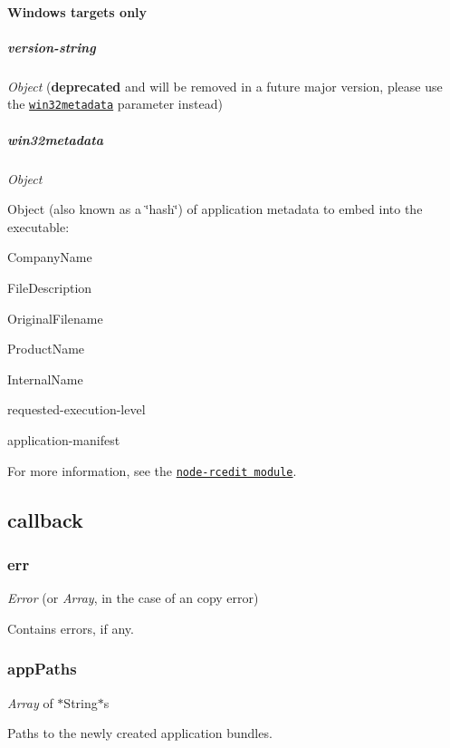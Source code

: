 \paragraph*{Windows targets only}

\subparagraph*{{\ttfamily version-\/string}}

{\itshape Object} ({\bfseries deprecated} and will be removed in a future major version, please use the \href{#win32metadata}{\tt {\ttfamily win32metadata}} parameter instead)

\subparagraph*{{\ttfamily win32metadata}}

{\itshape Object}

Object (also known as a \char`\"{}hash\char`\"{}) of application metadata to embed into the executable\+:
\begin{DoxyItemize}
\item {\ttfamily Company\+Name}
\item {\ttfamily File\+Description}
\item {\ttfamily Original\+Filename}
\item {\ttfamily Product\+Name}
\item {\ttfamily Internal\+Name}
\item {\ttfamily requested-\/execution-\/level}
\item {\ttfamily application-\/manifest}
\end{DoxyItemize}

For more information, see the \href{https://github.com/electron/node-rcedit}{\tt node-\/rcedit module}.

\subsection*{callback}

\subsubsection*{{\ttfamily err}}

{\itshape Error} (or {\itshape Array}, in the case of an {\ttfamily copy} error)

Contains errors, if any.

\subsubsection*{{\ttfamily app\+Paths}}

{\itshape Array} of $\ast$\+String$\ast$s

Paths to the newly created application bundles. 